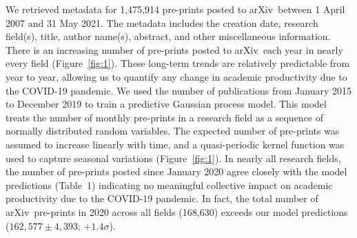 \documentclass[]{rsos}%
\newcommand{\arxiv}{arXiv}
\begin{document}
We retrieved metadata for 1,475,914 pre-prints posted to \arxiv\ between 1 April 2007 and 31 May 2021. The metadata includes the creation date, research field(s), title, author name(s), abstract, and other miscellaneous information\cite{Clement:2019}. There is an increasing number of pre-prints posted to \arxiv\ each year in nearly every field (Figure~\ref{fig:1}). These long-term trends are relatively predictable from year to year, allowing us to quantify any change in academic productivity due to the COVID-19 pandemic. We used the number of publications from January 2015 to December 2019 to train a predictive Gaussian process model\cite{Rasmussen:2006}. This model treats the number of monthly pre-prints in a research field as a sequence of normally distributed random variables. The expected number of pre-prints was assumed to increase linearly with time, and a quasi-periodic kernel function\cite{Rasmussen:2006,Ambikasaran:2014} was used to capture seasonal variations (Figure~\ref{fig:1}). In nearly all research fields, the number of pre-prints posted since January 2020 agree closely with the model predictions (Table~1) indicating no meaningful collective impact on academic productivity due to the COVID-19 pandemic. In fact, the total number of \arxiv\ pre-prints in 2020 across all fields (168,630) exceeds our model predictions ($162{,}577 \pm 4{,}393$; $+1.4\sigma$). 
\end{document}
